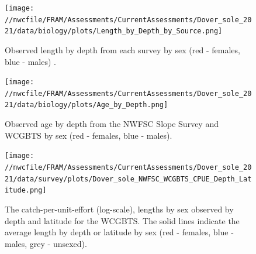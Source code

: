\documentclass[11pt,
  english,
  a4paper,
]{article}
\begin{document}

\begin{figure}
\centering
\texttt{[image: //nwcfile/FRAM/Assessments/CurrentAssessments/Dover\_sole\_2021/data/biology/plots/Length\_by\_Depth\_by\_Source.png]}
\caption{Observed length by depth from each survey by sex (red - females, blue - males) .\label{fig:data-len-depth}}
\end{figure}

\tagmcend\tagstructend

\newpage


\begin{figure}
\centering
\texttt{[image: //nwcfile/FRAM/Assessments/CurrentAssessments/Dover\_sole\_2021/data/biology/plots/Age\_by\_Depth.png]}
\caption{Observed age by depth from the NWFSC Slope Survey and WCGBTS by sex (red - females, blue - males).\label{fig:data-age-depth}}
\end{figure}

\tagmcend\tagstructend

\newpage


\begin{figure}
\centering
\texttt{[image: //nwcfile/FRAM/Assessments/CurrentAssessments/Dover\_sole\_2021/data/survey/plots/Dover\_sole\_NWFSC\_WCGBTS\_CPUE\_Depth\_Latitude.png]}
\caption{The catch-per-unit-effort (log-scale), lengths by sex observed by depth and latitude for the WCGBTS. The solid lines indicate the average length by depth or latitude by sex (red - females, blue - males, grey - unsexed).\label{fig:cpue-len}}
\end{figure}

\tagmcend\tagstructend

\clearpage

\end{document}
